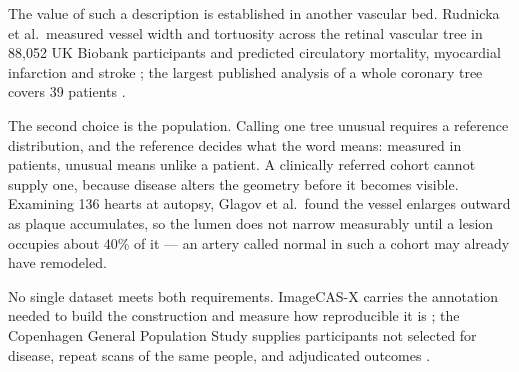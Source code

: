 The value of such a description is established in another vascular bed.
Rudnicka et al.\ measured vessel width and tortuosity across the retinal vascular tree in 88,052 UK
Biobank participants and predicted circulatory mortality, myocardial infarction and stroke
\cite{rudnicka2022quartz}; the largest published analysis of a whole coronary tree covers 39
patients \cite{shen2026geometry}.

The second choice is the population.
Calling one tree unusual requires a reference distribution, and the reference decides what the word
means: measured in patients, unusual means unlike a patient.
A clinically referred cohort cannot supply one, because disease alters the geometry before it
becomes visible.
Examining 136 hearts at autopsy, Glagov et al.\ found the vessel enlarges outward as plaque
accumulates, so the lumen does not narrow measurably until a lesion occupies about 40\% of it
\cite{glagov1987remodeling} --- an artery called normal in such a cohort may already have
remodeled.

No single dataset meets both requirements.
ImageCAS-X carries the annotation needed to build the construction and measure how reproducible it
is \cite{bransby2026imagecasx}; the Copenhagen General Population Study supplies participants not
selected for disease, repeat scans of the same people, and adjudicated outcomes
\cite{fuchs2023cgps}.
